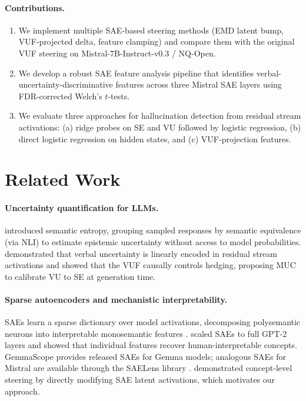 \documentclass{article}
\begin{document}
\paragraph{Contributions.}
\begin{enumerate}[leftmargin=*, nosep]
  \item We implement multiple SAE-based steering methods (EMD latent bump,
        VUF-projected delta, feature clamping) and compare them with the
        original VUF steering on Mistral-7B-Instruct-v0.3 / NQ-Open.
  \item We develop a robust SAE feature analysis pipeline that identifies
        verbal-uncertainty-discriminative features across three Mistral
        SAE layers using FDR-corrected Welch's $t$-tests.
  \item We evaluate three approaches for hallucination detection from residual
        stream activations: (a) ridge probes on SE and VU followed by logistic
        regression, (b) direct logistic regression on hidden states, and
        (c) VUF-projection features.
\end{enumerate}

\section{Related Work}
\label{sec:related}

\paragraph{Uncertainty quantification for LLMs.}
\citet{kuhn2023se} introduced semantic entropy, grouping sampled responses by
semantic equivalence (via NLI) to estimate epistemic uncertainty without access
to model probabilities.  \citet{kossen2024vcal} demonstrated that verbal
uncertainty is linearly encoded in residual stream activations and showed that
the VUF causally controls hedging, proposing MUC to calibrate VU to SE at
generation time.

\paragraph{Sparse autoencoders and mechanistic interpretability.}
SAEs learn a sparse dictionary over model activations, decomposing polysemantic
neurons into interpretable monosemantic features \citep{bricken2023monosemanticity}.
\citet{cunningham2023sparse} scaled SAEs to full GPT-2 layers and showed that
individual features recover human-interpretable concepts.  GemmaScope
\citep{lieberum2024gemma} provides released SAEs for Gemma models; analogous
SAEs for Mistral are available through the SAELens library \citep{bloom2024saelens}.
\citet{templeton2024scaling} demonstrated concept-level steering by directly
modifying SAE latent activations, which motivates our approach.
\end{document}
